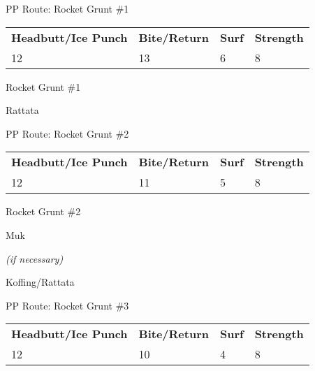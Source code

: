 \begin{paracol}{2}
\switchcolumn*
\begin{misc}{PP Route: Rocket Grunt \#1}
	\varwb
	\begin{tabu} to \textwidth {X[6,c] X[5,c] X[4,c] X[4,c]}
		\textbf{Headbutt/Ice Punch} & \textbf{Bite/Return} & \textbf{Surf} & \textbf{Strength}\\ 
		12 & 13 & 6 & 8
	\end{tabu}
	\varwe
\end{misc}

\switchcolumn
\begin{trainer}{Rocket Grunt \#1}
	\varwb
	\begin{fightSection}{Rattata}
		\item {}
		\item {} \bite
	\end{fightSection}
	\varwe
\end{trainer}

\switchcolumn*
\begin{misc}{PP Route: Rocket Grunt \#2}
	\varwb
	\begin{tabu} to \textwidth {X[6,c] X[5,c] X[4,c] X[4,c]}
		\textbf{Headbutt/Ice Punch} & \textbf{Bite/Return} & \textbf{Surf} & \textbf{Strength}\\ 
		12 & 11 & 5 & 8
	\end{tabu}
	\varwe
\end{misc}

\switchcolumn
\begin{trainer}{Rocket Grunt \#2}
	\varwb
	\begin{fightSection}{Muk}
		\item {} \surf
		\begin{notes}
			\small{\item {} \bite{} \textit{(if necessary)}}
		\end{notes}
	\end{fightSection}
	\begin{fightSection}{Koffing/Rattata}
		\item {} \bite{} 
	\end{fightSection}
	\varwe
\end{trainer}

\switchcolumn*
\begin{misc}{PP Route: Rocket Grunt \#3}
	\varwb
	\begin{tabu} to \textwidth {X[6,c] X[5,c] X[4,c] X[4,c]}
		\textbf{Headbutt/Ice Punch} & \textbf{Bite/Return} & \textbf{Surf} & \textbf{Strength}\\ 
		12 & 10 & 4 & 8
	\end{tabu}
	\varwe
\end{misc}


\end{paracol}
